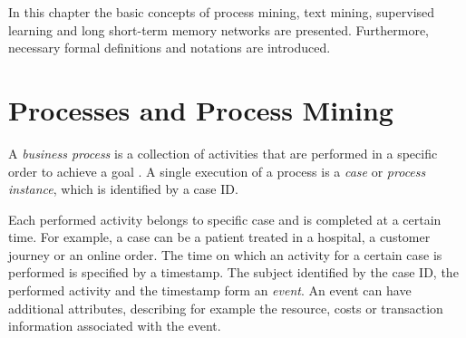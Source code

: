 In this chapter the basic concepts of process mining, text mining, supervised learning and long short-term memory networks are presented. Furthermore, necessary formal definitions and notations are introduced.

\section{Processes and Process Mining}

\begin{definition}
	A \textit{business process} is a collection of activities that are performed in a specific order to achieve a goal \cite{DBLP:conf/bpm/AalstAM11}.
	A single execution of a process is a \textit{case} or \textit{process instance}, which is identified by a case ID.
\end{definition}

Each performed activity belongs to specific case and is completed at a certain time.
For example, a case can be a patient treated in a hospital, a customer journey or an online order. The time on which an activity for a certain case is performed is specified by a timestamp.
The subject identified by the case ID, the performed activity and the timestamp form an \textit{event}.
An event can have additional attributes, describing for example the resource, costs or transaction information associated with the event.

